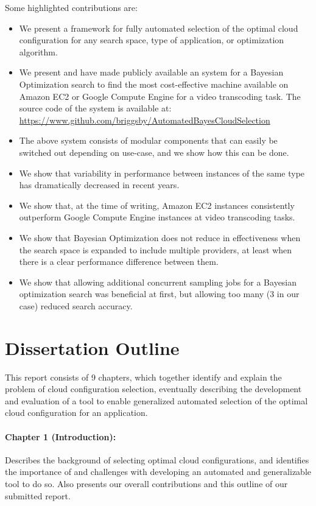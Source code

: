 \documentclass{report}
\begin{document}
Some highlighted contributions are:
\begin{itemize}
\item We present a framework for fully automated selection of the optimal cloud configuration for any search space, type of application, or optimization algorithm.
\item We present and have made publicly available an system for a Bayesian Optimization search to find the most cost-effective machine available on Amazon EC2 or Google Compute Engine for a video transcoding task. The source code of the system is available at: \url{https://www.github.com/briggsby/AutomatedBayesCloudSelection}
\item The above system consists of modular components that can easily be switched out depending on use-case, and we show how this can be done.
\item We show that variability in performance between instances of the same type has dramatically decreased in recent years.
\item We show that, at the time of writing, Amazon EC2 instances consistently outperform Google Compute Engine instances at video transcoding tasks.
\item We show that Bayesian Optimization does not reduce in effectiveness when the search space is expanded to include multiple providers, at least when there is a clear performance difference between them.
\item We show that allowing additional concurrent sampling jobs for a Bayesian optimization search was beneficial at first, but allowing too many (3 in our case) reduced search accuracy.
\end{itemize}
 
\section{Dissertation Outline}
This report consists of 9 chapters, which together identify and explain the problem of cloud configuration selection, eventually describing the development and evaluation of a tool to enable generalized automated selection of the optimal cloud configuration for an application.

\paragraph{Chapter 1 (Introduction):} Describes the background of selecting optimal cloud configurations, and identifies the importance of and challenges with developing an automated and generalizable tool to do so. Also presents our overall contributions and this outline of our submitted report.
\end{document}
